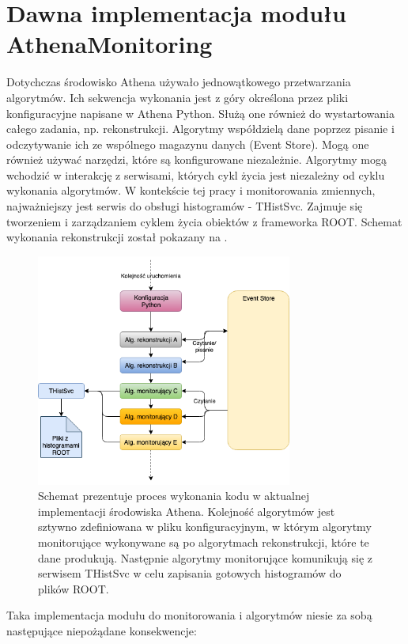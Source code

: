 \section{Dawna implementacja modułu AthenaMonitoring}
Dotychczas środowisko Athena używało jednowątkowego przetwarzania algorytmów. 
Ich sekwencja wykonania jest z góry określona przez pliki konfiguracyjne napisane w Athena Python. 
Służą one również do wystartowania całego zadania, np. rekonstrukcji. 
Algorytmy współdzielą dane poprzez pisanie i odczytywanie ich ze wspólnego magazynu danych (Event Store). 
Mogą one również używać narzędzi, które są konfigurowane niezależnie. 
Algorytmy mogą wchodzić w interakcję z serwisami, których cykl życia jest niezależny od cyklu wykonania algorytmów.
W kontekście tej pracy i monitorowania zmiennych, najważniejszy jest serwis do obsługi histogramów - THistSvc.
Zajmuje się tworzeniem i zarządzaniem cyklem życia obiektów z frameworka ROOT.
Schemat wykonania rekonstrukcji został pokazany na .

\begin{figure}[!ht]
\centering
\includegraphics[width=0.75\textwidth]{img/old_flow.png}
\caption{
Schemat prezentuje proces wykonania kodu w aktualnej implementacji środowiska Athena. 
Kolejność algorytmów jest sztywno zdefiniowana w pliku konfiguracyjnym, w którym algorytmy monitorujące wykonywane są po algorytmach rekonstrukcji, które te dane produkują. 
Następnie algorytmy monitorujące komunikują się z serwisem THistSvc w celu zapisania gotowych histogramów do plików ROOT.
}
\label{fig:athena:oldFlow}
\end{figure}

Taka implementacja modułu do monitorowania i algorytmów niesie za sobą następujące niepożądane konsekwencje:

